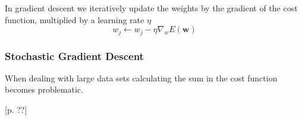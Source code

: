 In gradient descent we iteratively update the weights by the gradient of the cost function, multiplied by a learning rate $\eta$  
\[ w_j \leftarrow w_j - \eta \nabla_w E(\textbf{w}) \]

\subsubsection{Stochastic Gradient Descent}\label{sec:stochastic}

When dealing with large data sets calculating the sum in the cost function becomes problematic.
 



\begin{flushright}
\cite{Bishop2006}[p. ??]
\end{flushright}

